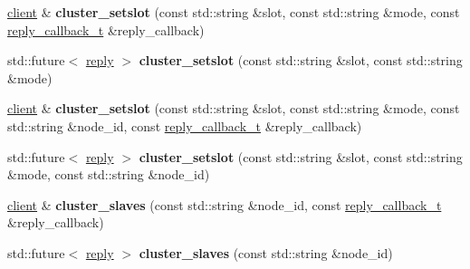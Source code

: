 \begin{DoxyCompactItemize}
\item 
\mbox{\label{classcpp__redis_1_1client_aeba14289869fe871eb9eb9c2503635a8}} 
\hyperlink{classcpp__redis_1_1client}{client} \& {\bfseries cluster\+\_\+setslot} (const std\+::string \&slot, const std\+::string \&mode, const \hyperlink{classcpp__redis_1_1client_a061a1140d36d2eaeda82b09a0bb3f9f2}{reply\+\_\+callback\+\_\+t} \&reply\+\_\+callback)
\item 
\mbox{\label{classcpp__redis_1_1client_ad9b75e2c90b1b87fa93a3ac76bd1512f}} 
std\+::future$<$ \hyperlink{classcpp__redis_1_1reply}{reply} $>$ {\bfseries cluster\+\_\+setslot} (const std\+::string \&slot, const std\+::string \&mode)
\item 
\mbox{\label{classcpp__redis_1_1client_a4e87a3163d16db267136a127e5c843e2}} 
\hyperlink{classcpp__redis_1_1client}{client} \& {\bfseries cluster\+\_\+setslot} (const std\+::string \&slot, const std\+::string \&mode, const std\+::string \&node\+\_\+id, const \hyperlink{classcpp__redis_1_1client_a061a1140d36d2eaeda82b09a0bb3f9f2}{reply\+\_\+callback\+\_\+t} \&reply\+\_\+callback)
\item 
\mbox{\label{classcpp__redis_1_1client_a824c1234198e48badeccf4190b610e32}} 
std\+::future$<$ \hyperlink{classcpp__redis_1_1reply}{reply} $>$ {\bfseries cluster\+\_\+setslot} (const std\+::string \&slot, const std\+::string \&mode, const std\+::string \&node\+\_\+id)
\item 
\mbox{\label{classcpp__redis_1_1client_ac03fb62a9eb5abbb5248bc38fd4dfb5e}} 
\hyperlink{classcpp__redis_1_1client}{client} \& {\bfseries cluster\+\_\+slaves} (const std\+::string \&node\+\_\+id, const \hyperlink{classcpp__redis_1_1client_a061a1140d36d2eaeda82b09a0bb3f9f2}{reply\+\_\+callback\+\_\+t} \&reply\+\_\+callback)
\item 
\mbox{\label{classcpp__redis_1_1client_afbfca7fb91f492768c7ac75677f433a2}} 
std\+::future$<$ \hyperlink{classcpp__redis_1_1reply}{reply} $>$ {\bfseries cluster\+\_\+slaves} (const std\+::string \&node\+\_\+id)
\item 
\mbox{\label{classcpp__redis_1_1client_a7d0dad34ca2fe2e301b202388bb47e10}} 

\end{DoxyCompactItemize}
